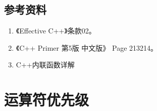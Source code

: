 \documentclass[letterpaper,10pt,english]{sphinxmanual}
\begin{document}
\subsection{参考资料}
\label{\detokenize{cpp/20_define:id1}}\begin{enumerate}
\item {} 
《Effective C++》条款02。

\item {} 
《C++ Primer 第5版 中文版》 Page 213\textendash{}214。

\item {} 
C++内联函数详解

\end{enumerate}
\begin{quote}

\end{quote}


\section{运算符优先级}
\label{\detokenize{cpp/21_operatorPrior::doc}}\label{\detokenize{cpp/21_operatorPrior:id1}}
\end{document}
